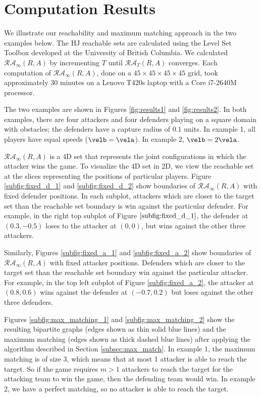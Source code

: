 \section{Computation Results}
\label{sec:results}
We illustrate our reachability and maximum matching approach in the two examples below. The HJ reachable sets are calculated using the Level Set Toolbox \cite{LSToolbox} developed at the University of British Columbia. We calculated $\mathcal{RA}_\infty(R,A)$ by incrementing $T$ until $\mathcal{RA}_T(R,A)$ converges. Each computation of $\mathcal{RA}_\infty(R,A)$, done on a $45\times45\times45\times45$ grid, took approximately 30 minutes on a Lenovo T420s laptop with a Core i7-2640M processor. 

The two examples are shown in Figures \ref{fig:results1} and \ref{fig:results2}. In both examples, there are four attackers and four defenders playing on a square domain with obstacles; the defenders have a capture radius of $0.1$ units. In example 1, all players have equal speeds ($\velb=\vela$). In example 2, $\velb=2\vela$.

$\mathcal{RA}_\infty(R,A)$ is a 4D set that represents the joint configurations in which the attacker wins the game. To visualize the 4D set in 2D, we view the reachable set at the slices representing the positions of particular players. Figure \ref{subfig:fixed_d_1} and \ref{subfig:fixed_d_2} show boundaries of $\mathcal{RA}_\infty(R,A)$ with fixed defender positions. In each subplot, attackers which are closer to the target set than the reachable set boundary is win against the particular defender. For example, in the right top subplot of Figure $\ref{subfig:fixed_d_1}$, the defender at $(0.3,-0.5)$ loses to the attacker at $(0,0)$, but wins against the other three attackers. 

Similarly, Figures \ref{subfig:fixed_a_1} and \ref{subfig:fixed_a_2} show boundaries of $\mathcal{RA}_\infty(R,A)$ with fixed attacker positions. Defenders which are closer to the target set than the reachable set boundary win against the particular attacker. For example, in the top left subplot of Figure \ref{subfig:fixed_a_2}, the attacker at $(0.8, 0.6)$ wins against the defender at $(-0.7, 0.2)$ but loses against the other three defenders.

Figures \ref{subfig:max_matching_1} and \ref{subfig:max_matching_2} show the resulting bipartite graphs (edges shown as thin solid blue lines) and the maximum matching (edges shown as thick dashed blue lines) after applying the algorithm described in Section \ref{subsec:max_match}. In example 1, the maximum matching is of size 3, which means that at most 1 attacker is able to reach the target. So if the game requires $m>1$ attackers to reach the target for the attacking team to win the game, then the defending team would win. In example 2, we have a perfect matching, so no attacker is able to reach the target.


